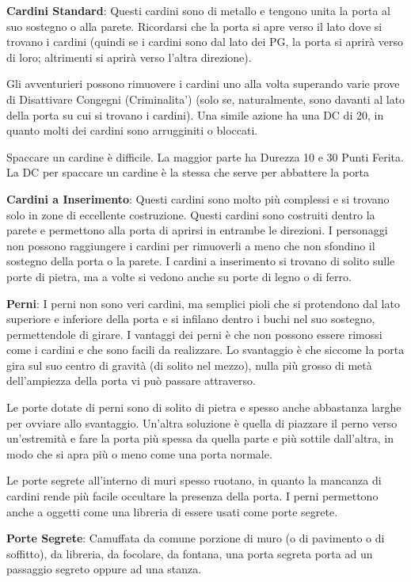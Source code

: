 \documentclass[a4paper,11pt,twoside,openany]{book}
\begin{document}
\textbf{Cardini Standard}: Questi cardini sono di metallo e tengono unita la porta al suo sostegno o alla parete. Ricordarsi che la porta si apre verso il lato dove si trovano i cardini (quindi se i cardini sono dal lato dei PG, la porta si aprirà verso di loro; altrimenti si aprirà verso l’altra direzione).

Gli avventurieri possono rimuovere i cardini uno alla volta superando varie prove di Disattivare Congegni (Criminalita') (solo se, naturalmente, sono davanti al lato della porta su cui si trovano i cardini). Una simile azione ha una DC di 20, in quanto molti dei cardini sono arrugginiti o bloccati.

Spaccare un cardine è difficile. La maggior parte ha Durezza 10 e 30 Punti Ferita. La DC per spaccare un cardine è la stessa che serve per abbattere la porta

\textbf{Cardini a Inserimento}: Questi cardini sono molto più complessi e si trovano solo in zone di eccellente costruzione. Questi cardini sono costruiti dentro la parete e permettono alla porta di aprirsi in entrambe le direzioni. I personaggi non possono raggiungere i cardini per rimuoverli a meno che non sfondino il sostegno della porta o la parete. I cardini a inserimento si trovano di solito sulle porte di pietra, ma a volte si vedono anche su porte di legno o di ferro.

\textbf{Perni}: I perni non sono veri cardini, ma semplici pioli che si protendono dal lato superiore e inferiore della porta e si infilano dentro i buchi nel suo sostegno, permettendole di girare. I vantaggi dei perni è che non possono essere rimossi come i cardini e che sono facili da realizzare. Lo svantaggio è che siccome la porta gira sul suo centro di gravità (di solito nel mezzo), nulla più grosso di metà dell'ampiezza della porta vi può passare attraverso.

Le porte dotate di perni sono di solito di pietra e spesso anche abbastanza larghe per ovviare allo svantaggio. Un'altra soluzione è quella di piazzare il perno verso un'estremità e fare la porta più spessa da quella parte e più sottile dall'altra, in modo che si apra più o meno come una porta normale.

Le porte segrete all'interno di muri spesso ruotano, in quanto la mancanza di cardini rende più facile occultare la presenza della porta. I perni permettono anche a oggetti come una libreria di essere usati come porte segrete.

\textbf{Porte Segrete}: Camuffata da comune porzione di muro (o di pavimento o di soffitto), da libreria, da focolare, da fontana, una porta segreta porta ad un passaggio segreto oppure ad una stanza.
\end{document}
